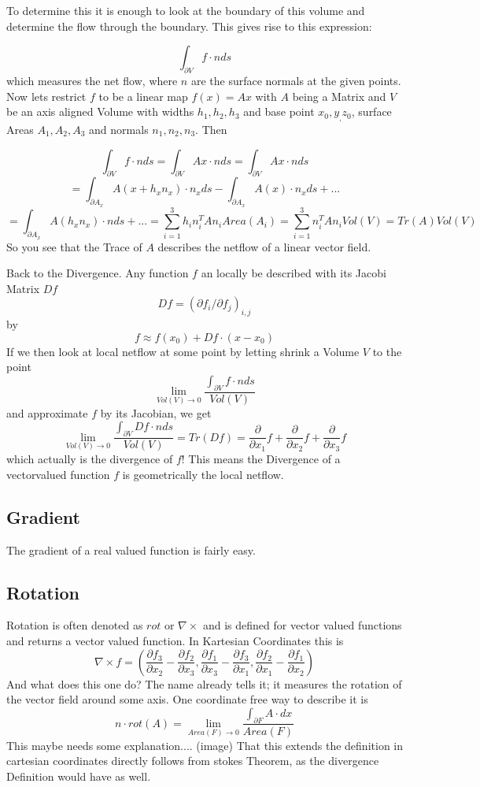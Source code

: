 To determine this it is enough to look at the boundary of this volume and determine the flow through the boundary. This gives rise to this expression:

\[\int_{\partial V} f \cdot n ds\]
which measures the net flow, where $n$ are the surface normals at the given points. Now lets restrict $f$ to be a linear map $f(x) = A x$ with $A$ being a Matrix and $V$ be an axis aligned Volume with widths $h_1,h_2,h_3$ and base point $x_0,y_,z_0$, surface Areas $A_1, A_2, A_3$ and normals $n_1,n_2,n_3$. Then

\[\int_{\partial V} f \cdot n ds = \int_{\partial V} Ax \cdot n ds = \int_{\partial V} Ax \cdot n ds\]
\[= \int_{\partial A_x} A(x + h_xn_x) \cdot n_x ds - \int_{\partial A_x} A(x) \cdot n_x ds + ...\]
\[= \int_{\partial A_x} A(h_xn_x) \cdot n ds + ... = \sum_{i=1}^3 h_i n_i^TA n_i Area(A_i) = \sum_{i=1}^3 n_i^TA n_i Vol(V) = Tr(A) Vol(V)\]
So you see that the Trace of $A$ describes the netflow of a linear vector field. 

Back to the Divergence. Any function $f$ an locally be described with its Jacobi Matrix $Df$
\[Df = (\partial f_i / \partial f_j)_{i,j}\]
by 
\[f \approx f(x_0) + Df \cdot (x-x_0) \]
If we then look at local netflow at some point by letting shrink a Volume $V$ to the point  
\[\lim_{Vol(V) \rightarrow 0}\frac{\int_{\partial V} f \cdot n ds}{Vol(V)}\]
and approximate $f$ by its Jacobian, we get
\[\lim_{Vol(V) \rightarrow 0}\frac{\int_{\partial V} Df \cdot n ds}{Vol(V)} = Tr(Df)= \frac{ \partial}{\partial x_1} f + \frac{ \partial}{\partial x_2}f + \frac{ \partial}{\partial x_3}f\]
which actually is the divergence of $f$! This means the Divergence of a vectorvalued function $f$ is geometrically the local netflow.

\subsection{Gradient}
The gradient of a real valued function is fairly easy.

\subsection{Rotation}
Rotation is often denoted as $rot$ or $\nabla \times$ and is defined for vector valued functions and returns a vector valued function.  In Kartesian Coordinates this is
\[\nabla \times f = \left( \frac{ \partial f_3}{\partial x_2}- \frac{ \partial f_2}{\partial x_3}, \frac{ \partial f_1}{\partial x_3}- \frac{ \partial f_3}{\partial x_1}, \frac{ \partial f_2}{\partial x_1}- \frac{ \partial f_1}{\partial x_2}\right)\]
And what does this one do? The name already tells it; it measures the rotation of the vector field around some axis. One coordinate free way to describe it is
\[n\cdot rot(A) = \lim_{Area(F)\rightarrow 0 } \frac{\int_{\partial F} A \cdot dx}{Area(F)} \]
This maybe needs some explanation.... (image) That this extends the definition in cartesian coordinates directly follows from stokes Theorem, as the divergence Definition would have as well.


